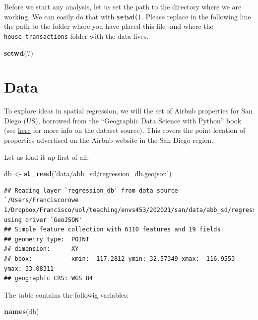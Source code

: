 \documentclass[
]{book}
\newenvironment{Shaded}{\begin{snugshade}}{\end{snugshade}}
\newcommand{\KeywordTok}[1]{\textcolor[rgb]{0.13,0.29,0.53}{\textbf{#1}}}
\newcommand{\NormalTok}[1]{#1}
\newcommand{\StringTok}[1]{\textcolor[rgb]{0.31,0.60,0.02}{#1}}
\begin{document}
Before we start any analysis, let us set the path to the directory where we are working. We can easily do that with \texttt{setwd()}. Please replace in the following line the path to the folder where you have placed this file -and where the \texttt{house\_transactions} folder with the data lives.

\begin{Shaded}
\begin{Highlighting}[]
\KeywordTok{setwd}\NormalTok{(}\StringTok{'.'}\NormalTok{)}
\end{Highlighting}
\end{Shaded}

\hypertarget{data-2}{%
\section{Data}\label{data-2}}

To explore ideas in spatial regression, we will the set of Airbnb properties for San Diego (US), borrowed from the ``Geographic Data Science with Python'' book (see \href{https://geographicdata.science/book/data/airbnb/regression_cleaning.html}{here} for more info on the dataset source). This covers the point location of properties advertised on the Airbnb website in the San Diego region.

Let us load it up first of all:

\begin{Shaded}
\begin{Highlighting}[]
\NormalTok{db <-}\StringTok{ }\KeywordTok{st_read}\NormalTok{(}\StringTok{'data/abb_sd/regression_db.geojson'}\NormalTok{)}
\end{Highlighting}
\end{Shaded}

\begin{verbatim}
## Reading layer `regression_db' from data source `/Users/Franciscorowe 1/Dropbox/Francisco/uol/teaching/envs453/202021/san/data/abb_sd/regression_db.geojson' using driver `GeoJSON'
## Simple feature collection with 6110 features and 19 fields
## geometry type:  POINT
## dimension:      XY
## bbox:           xmin: -117.2812 ymin: 32.57349 xmax: -116.9553 ymax: 33.08311
## geographic CRS: WGS 84
\end{verbatim}

The table contains the followig variables:

\begin{Shaded}
\begin{Highlighting}[]
\KeywordTok{names}\NormalTok{(db)}
\end{Highlighting}
\end{Shaded}
\end{document}
